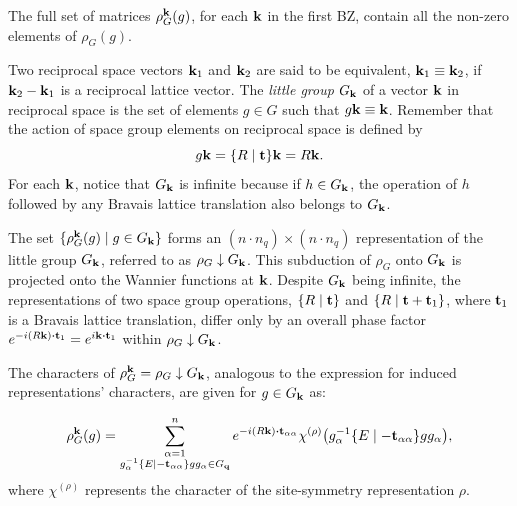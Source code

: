 The full set of matrices $\rho_G^{\vb{k}}(g)$, for each ${\vb{k}}$ in the first BZ, contain all the non-zero elements of $\rho_G(g)$.


\begin{definition}
Two reciprocal space vectors ${\vb{k}}_1$ and ${\vb{k}}_2$ are said to be equivalent, ${\vb{k}}_1 \equiv {\vb{k}}_2$, if ${\vb{k}}_2 - {\vb{k}}_1$ is a reciprocal lattice vector. The \textit{little group} $G_{\vb{k}}$ of a vector ${\vb{k}}$ in reciprocal space is the set of elements $g \in G$ such that $g {\vb{k}} \equiv {\vb{k}}$. Remember that the action of space group elements on reciprocal space is defined by
$$
g{\vb{k}} = \{ R \mid {\vb{t}} \}{\vb{k}} = R{\vb{k}}.
$$
For each ${\vb{k}}$, notice that $G_{\vb{k}}$ is infinite because if $h \in G_{\vb{k}}$, the operation of $h$ followed by any Bravais lattice translation also belongs to $G_{\vb{k}}$.
\end{definition}

\n

The set \(\{\rho_G^{\vb{k}}(g) \mid g \in G_{\vb{k}}\}\) forms an \((n \cdot n_q) \times (n \cdot n_q)\) representation of the little group \(G_{\vb{k}}\), referred to as \(\rho_G \downarrow G_{\vb{k}}\). This subduction of \(\rho_G\) onto \(G_{\vb{k}}\) is projected onto the Wannier functions at \({\vb{k}}\). Despite \(G_{\vb{k}}\) being infinite, the representations of two space group operations, \(\{ R \mid {\vb{t}} \}\) and \(\{ R \mid {\vb{t}} + {\vb{t}}_1 \}\), where \({\vb{t}}_1\) is a Bravais lattice translation, differ only by an overall phase factor \(e^{-i(R\k) \vdot \t_1} = e^{i\k \vdot \t_1}\) within \(\rho_G \downarrow G_{\vb{k}}\).

The characters of \(\rho_G^{\vb{k}} = \rho_G \downarrow G_{\vb{k}}\), analogous to the expression for induced representations' characters, are given for \(g \in G_{\vb{k}}\) as:

\begin{equation} \label{eq:}
\rho_G^\k(g) =
\sum_{\substack{\alpha=1 \\ g_\alpha^{-1}\sg{E}{-\t_{\alpha\alpha}}g g_\alpha \in G_\q}}^n e^{-i(R\k)\vdot\t_{\alpha\alpha}}
\chi^{(\rho)}\qty(g_\alpha^{-1}\sg{E}{-\t_{\alpha\alpha}}g g_\alpha),
\end{equation}
where \(\chi^{(\rho)}\) represents the character of the site-symmetry representation \(\rho\).

